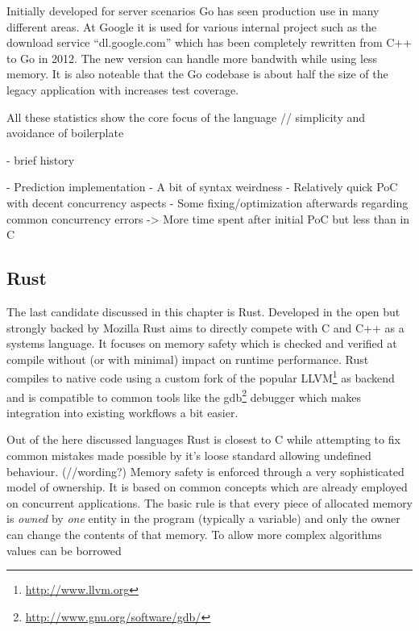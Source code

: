 

Initially developed for server scenarios Go has seen production use in many different areas. At Google it is used for various internal project such as the download service ``dl.google.com'' which has been completely rewritten from C++ to Go in 2012. The new version can handle more bandwith while using less memory. It is also noteable that the Go codebase is about half the size of the legacy application with increases test coverage.~\cite{go_dl_google}

All these statistics show the core focus of the language // simplicity and avoidance of boilerplate

- brief history

- Prediction implementation
    - A bit of syntax weirdness
    - Relatively quick PoC with decent concurrency aspects
    - Some fixing/optimization afterwards regarding common concurrency errors
    -> More time spent after initial PoC but less than in C


\subsection*{Rust}
\label{subsec:State_of_the_art::Candidates::Rust}
The last candidate discussed in this chapter is Rust. Developed in the open but strongly backed by Mozilla Rust aims to directly compete with C and C++ as a systems language. It focuses on memory safety which is checked and verified at compile without (or with minimal) impact on runtime performance. Rust compiles to native code using a custom fork of the popular LLVM\footnote{\url{http://www.llvm.org}} as backend and is compatible to common tools like the gdb\footnote{\url{http://www.gnu.org/software/gdb/}} debugger which makes integration into existing workflows a bit easier.

Out of the here discussed languages Rust is closest to C while attempting to fix common mistakes made possible by it's loose standard allowing undefined behaviour. (//wording?) Memory safety is enforced through a very sophisticated model of ownership. It is based on common concepts which are already employed on concurrent applications. The basic rule is that every piece of allocated memory is \textit{owned} by \textit{one} entity in the program (typically a variable) and only the owner can change the contents of that memory. To allow more complex algorithms values can be borrowed

